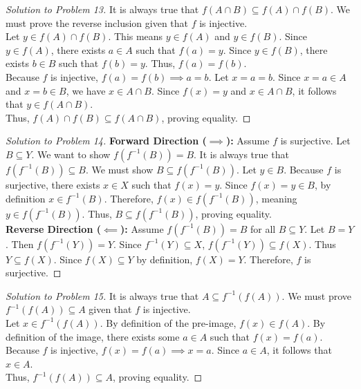 \documentclass[11pt, letterpaper]{article}
\theoremstyle{definition}
\theoremstyle{remark}
\begin{document}
\begin{proof}[Solution to Problem 13]
It is always true that $f(A \cap B) \subseteq f(A) \cap f(B)$. We must prove the reverse inclusion given that $f$ is injective. \\
Let $y \in f(A) \cap f(B)$. This means $y \in f(A)$ and $y \in f(B)$. Since $y \in f(A)$, there exists $a \in A$ such that $f(a) = y$. Since $y \in f(B)$, there exists $b \in B$ such that $f(b) = y$. Thus, $f(a) = f(b)$. \\
Because $f$ is injective, $f(a) = f(b) \implies a = b$. Let $x = a = b$. Since $x = a \in A$ and $x = b \in B$, we have $x \in A \cap B$. Since $f(x) = y$ and $x \in A \cap B$, it follows that $y \in f(A \cap B)$. \\
Thus, $f(A) \cap f(B) \subseteq f(A \cap B)$, proving equality.
\end{proof}

\begin{proof}[Solution to Problem 14]
\textbf{Forward Direction ($\implies$):} Assume $f$ is surjective. Let $B \subseteq Y$. We want to show $f(f^{-1}(B)) = B$. 
It is always true that $f(f^{-1}(B)) \subseteq B$. We must show $B \subseteq f(f^{-1}(B))$. Let $y \in B$. Because $f$ is surjective, there exists $x \in X$ such that $f(x) = y$. Since $f(x) = y \in B$, by definition $x \in f^{-1}(B)$. Therefore, $f(x) \in f(f^{-1}(B))$, meaning $y \in f(f^{-1}(B))$. Thus, $B \subseteq f(f^{-1}(B))$, proving equality. \\
\textbf{Reverse Direction ($\impliedby$):} Assume $f(f^{-1}(B)) = B$ for all $B \subseteq Y$. Let $B = Y$. Then $f(f^{-1}(Y)) = Y$. Since $f^{-1}(Y) \subseteq X$, $f(f^{-1}(Y)) \subseteq f(X)$. Thus $Y \subseteq f(X)$. Since $f(X) \subseteq Y$ by definition, $f(X) = Y$. Therefore, $f$ is surjective.
\end{proof}

\begin{proof}[Solution to Problem 15]
It is always true that $A \subseteq f^{-1}(f(A))$. We must prove $f^{-1}(f(A)) \subseteq A$ given that $f$ is injective. \\
Let $x \in f^{-1}(f(A))$. By definition of the pre-image, $f(x) \in f(A)$. By definition of the image, there exists some $a \in A$ such that $f(x) = f(a)$. Because $f$ is injective, $f(x) = f(a) \implies x = a$. Since $a \in A$, it follows that $x \in A$. \\
Thus, $f^{-1}(f(A)) \subseteq A$, proving equality.
\end{proof}
\end{document}
